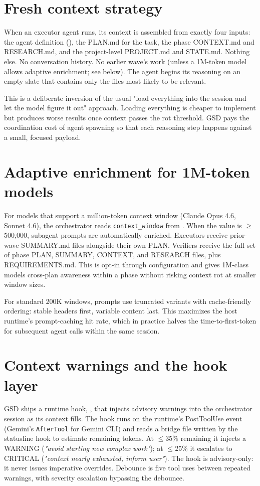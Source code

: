 \documentclass[11pt,letterpaper,openany]{book}
\begin{document}
\section{Fresh context strategy}

When an executor agent runs, its context is assembled from exactly four inputs: the agent definition (), the PLAN.md for the task, the phase CONTEXT.md and RESEARCH.md, and the project-level PROJECT.md and STATE.md. Nothing else. No conversation history. No earlier wave's work (unless a 1M-token model allows adaptive enrichment; see below). The agent begins its reasoning on an empty slate that contains only the files most likely to be relevant.

This is a deliberate inversion of the usual "load everything into the session and let the model figure it out" approach. Loading everything is cheaper to implement but produces worse results once context passes the rot threshold. GSD pays the coordination cost of agent spawning so that each reasoning step happens against a small, focused payload.

\section{Adaptive enrichment for 1M-token models}

For models that support a million-token context window (Claude Opus 4.6, Sonnet 4.6), the orchestrator reads \texttt{context\_window} from . When the value is \(\geq\) 500{,}000, subagent prompts are automatically enriched. Executors receive prior-wave SUMMARY.md files alongside their own PLAN. Verifiers receive the full set of phase PLAN, SUMMARY, CONTEXT, and RESEARCH files, plus REQUIREMENTS.md. This is opt-in through configuration and gives 1M-class models cross-plan awareness within a phase without risking context rot at smaller window sizes.

For standard 200K windows, prompts use truncated variants with cache-friendly ordering: stable headers first, variable content last. This maximizes the host runtime's prompt-caching hit rate, which in practice halves the time-to-first-token for subsequent agent calls within the same session.

\section{Context warnings and the hook layer}

GSD ships a runtime hook, , that injects advisory warnings into the orchestrator session as its context fills. The hook runs on the runtime's PostToolUse event (Gemini's \texttt{AfterTool} for Gemini CLI) and reads a bridge file written by the statusline hook to estimate remaining tokens. At \(\leq\)35\% remaining it injects a WARNING (\textit{"avoid starting new complex work"}); at \(\leq\)25\% it escalates to CRITICAL (\textit{"context nearly exhausted, inform user"}). The hook is advisory-only: it never issues imperative overrides. Debounce is five tool uses between repeated warnings, with severity escalation bypassing the debounce.
\end{document}
